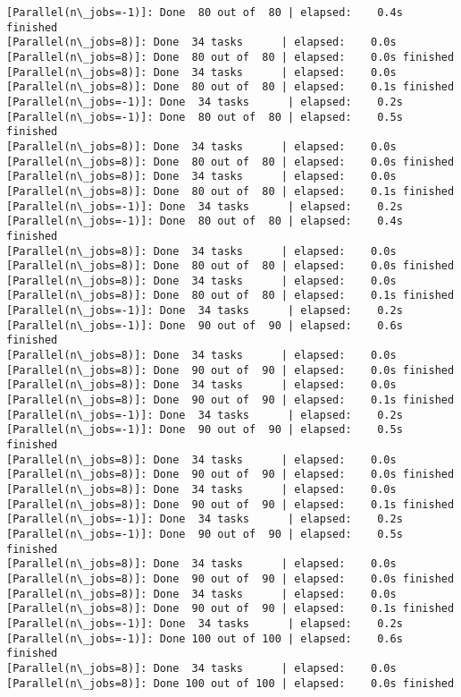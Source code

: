 \documentclass[11pt]{article}
\begin{document}
\begin{Verbatim}[commandchars=\\\{\}]
[Parallel(n\_jobs=-1)]: Done  80 out of  80 | elapsed:    0.4s finished
[Parallel(n\_jobs=8)]: Done  34 tasks      | elapsed:    0.0s
[Parallel(n\_jobs=8)]: Done  80 out of  80 | elapsed:    0.0s finished
[Parallel(n\_jobs=8)]: Done  34 tasks      | elapsed:    0.0s
[Parallel(n\_jobs=8)]: Done  80 out of  80 | elapsed:    0.1s finished
[Parallel(n\_jobs=-1)]: Done  34 tasks      | elapsed:    0.2s
[Parallel(n\_jobs=-1)]: Done  80 out of  80 | elapsed:    0.5s finished
[Parallel(n\_jobs=8)]: Done  34 tasks      | elapsed:    0.0s
[Parallel(n\_jobs=8)]: Done  80 out of  80 | elapsed:    0.0s finished
[Parallel(n\_jobs=8)]: Done  34 tasks      | elapsed:    0.0s
[Parallel(n\_jobs=8)]: Done  80 out of  80 | elapsed:    0.1s finished
[Parallel(n\_jobs=-1)]: Done  34 tasks      | elapsed:    0.2s
[Parallel(n\_jobs=-1)]: Done  80 out of  80 | elapsed:    0.4s finished
[Parallel(n\_jobs=8)]: Done  34 tasks      | elapsed:    0.0s
[Parallel(n\_jobs=8)]: Done  80 out of  80 | elapsed:    0.0s finished
[Parallel(n\_jobs=8)]: Done  34 tasks      | elapsed:    0.0s
[Parallel(n\_jobs=8)]: Done  80 out of  80 | elapsed:    0.1s finished
[Parallel(n\_jobs=-1)]: Done  34 tasks      | elapsed:    0.2s
[Parallel(n\_jobs=-1)]: Done  90 out of  90 | elapsed:    0.6s finished
[Parallel(n\_jobs=8)]: Done  34 tasks      | elapsed:    0.0s
[Parallel(n\_jobs=8)]: Done  90 out of  90 | elapsed:    0.0s finished
[Parallel(n\_jobs=8)]: Done  34 tasks      | elapsed:    0.0s
[Parallel(n\_jobs=8)]: Done  90 out of  90 | elapsed:    0.1s finished
[Parallel(n\_jobs=-1)]: Done  34 tasks      | elapsed:    0.2s
[Parallel(n\_jobs=-1)]: Done  90 out of  90 | elapsed:    0.5s finished
[Parallel(n\_jobs=8)]: Done  34 tasks      | elapsed:    0.0s
[Parallel(n\_jobs=8)]: Done  90 out of  90 | elapsed:    0.0s finished
[Parallel(n\_jobs=8)]: Done  34 tasks      | elapsed:    0.0s
[Parallel(n\_jobs=8)]: Done  90 out of  90 | elapsed:    0.1s finished
[Parallel(n\_jobs=-1)]: Done  34 tasks      | elapsed:    0.2s
[Parallel(n\_jobs=-1)]: Done  90 out of  90 | elapsed:    0.5s finished
[Parallel(n\_jobs=8)]: Done  34 tasks      | elapsed:    0.0s
[Parallel(n\_jobs=8)]: Done  90 out of  90 | elapsed:    0.0s finished
[Parallel(n\_jobs=8)]: Done  34 tasks      | elapsed:    0.0s
[Parallel(n\_jobs=8)]: Done  90 out of  90 | elapsed:    0.1s finished
[Parallel(n\_jobs=-1)]: Done  34 tasks      | elapsed:    0.2s
[Parallel(n\_jobs=-1)]: Done 100 out of 100 | elapsed:    0.6s finished
[Parallel(n\_jobs=8)]: Done  34 tasks      | elapsed:    0.0s
[Parallel(n\_jobs=8)]: Done 100 out of 100 | elapsed:    0.0s finished

\end{Verbatim}
\end{document}
